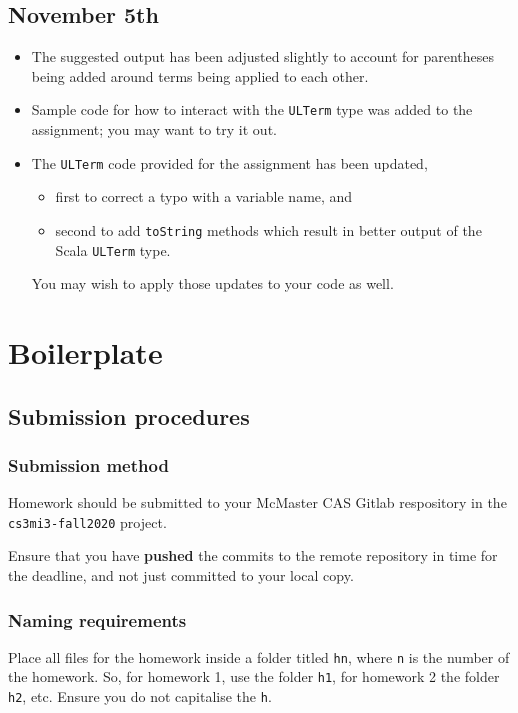 \documentclass[11pt]{article}
\begin{document}
\subsection*{November 5th}
\label{sec:orge665b74}

\begin{itemize}
\item The suggested output has been adjusted slightly
to account for parentheses being added around
terms being applied to each other.
\item Sample code for how to interact with the \texttt{ULTerm} type
was added to the assignment;
you may want to try it out.
\item The \texttt{ULTerm} code provided for the assignment
has been updated,
\begin{itemize}
\item first to correct a typo with a variable name, and
\item second to add \texttt{toString} methods which result in better
output of the Scala \texttt{ULTerm} type.
\end{itemize}
You may wish to apply those updates to your code as well.
\end{itemize}

\section*{Boilerplate}
\label{sec:orgdcade64}
\subsection*{Submission procedures}
\label{sec:org7fd2e98}
\subsubsection*{Submission method}
\label{sec:orgfbec90b}

Homework should be submitted to your McMaster CAS Gitlab respository
in the \texttt{cs3mi3-fall2020} project.

Ensure that you have \textbf{pushed} the commits to the remote repository
in time for the deadline, and not just committed to your local copy.

\subsubsection*{Naming requirements}
\label{sec:orgd0623c5}

Place all files for the homework
inside a folder titled \texttt{hn}, where \texttt{n} is the number of the homework.
So, for homework 1, use the folder \texttt{h1}, for homework 2 the folder \texttt{h2}, etc.
Ensure you do not capitalise the \texttt{h}.
\end{document}
